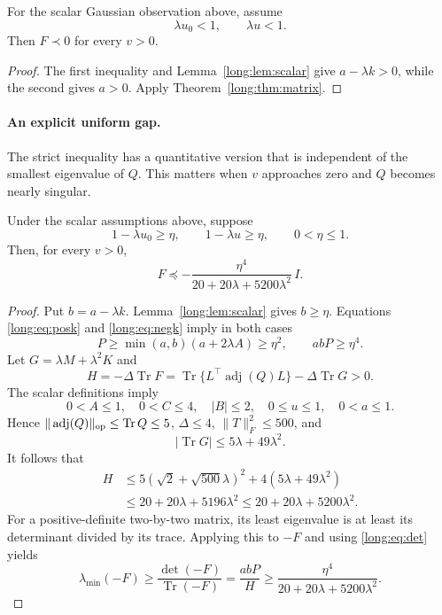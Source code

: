 \documentclass[11pt,reqno]{amsart}
\newcommand{\Tr}{\operatorname{Tr}}
\begin{document}
\begin{cor}\label{long:cor:AT}
For the scalar Gaussian observation above, assume
\[
 \lambda u_0<1,\qquad \lambda u<1.
\]
Then $F\prec0$ for every $v>0$.
\end{cor}
\begin{proof}
The first inequality and Lemma~\ref{long:lem:scalar} give
$a-\lambda k>0$, while the second gives $a>0$.
Apply Theorem~\ref{long:thm:matrix}.
\end{proof}

\paragraph{An explicit uniform gap.}
The strict inequality has a quantitative version that is independent of the
smallest eigenvalue of $Q$. This matters when $v$ approaches zero and $Q$
becomes nearly singular.

\begin{cor}\label{long:cor:gap}
Under the scalar assumptions above, suppose
\[
 1-\lambda u_0\ge\eta,
 \qquad 1-\lambda u\ge\eta,
 \qquad 0<\eta\le1.
\]
Then, for every $v>0$,
\begin{equation*}
 F\preceq-\frac{\eta^4}{20+20\lambda+5200\lambda^2}\,I.
\end{equation*}
\end{cor}
\begin{proof}
Put $b=a-\lambda k$. Lemma~\ref{long:lem:scalar} gives $b\ge\eta$.
Equations \eqref{long:eq:posk} and \eqref{long:eq:negk} imply in both cases
\[
 P\ge\min(a,b)(a+2\lambda A)\ge\eta^2,
 \qquad abP\ge\eta^4.
\]
Let $G=\lambda M+\lambda^2K$ and
\[
 H=-\Delta\Tr F
   =\Tr\{L^\top\operatorname{adj}(Q)L\}
      -\Delta\Tr G>0.
\]
The scalar definitions imply
\[
 0<A\le1,\quad 0<C\le4,\quad |B|\le2,
 \quad 0\le u\le1,\quad 0<a\le1.
\]
Hence $\|\operatorname{adj}(Q)\|_{\rm op}\le\Tr Q\le5$,
$\Delta\le4$, $\|T\|_F^2\le500$, and
\[
 |\Tr G|\le5\lambda+49\lambda^2.
\]
It follows that
\begin{align*}
 H&\le5(\sqrt2+\sqrt{500}\lambda)^2
          +4(5\lambda+49\lambda^2)\\
  &\le20+20\lambda+5196\lambda^2
   \le20+20\lambda+5200\lambda^2.
\end{align*}
For a positive-definite two-by-two matrix, its least eigenvalue is at least
its determinant divided by its trace. Applying this to $-F$ and using
\eqref{long:eq:det} yields
\[
 \lambda_{\min}(-F)
 \ge\frac{\det(-F)}{\Tr(-F)}
 =\frac{abP}{H}
 \ge\frac{\eta^4}{20+20\lambda+5200\lambda^2}.
\]
\end{proof}
\end{document}
